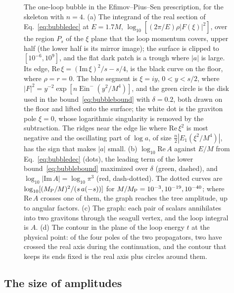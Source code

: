 \documentclass[aps,prd,10pt,twocolumn,superscriptaddress,nofootinbib,floatfix,longbibliography]{revtex4-2}
\newcommand{\Ein}{\operatorname{Ein}}
\begin{document}
\begin{figure}[t]
\caption{The one-loop bubble in the Efimov--Pius--Sen prescription, for the skeleton with $n=4$. (a) The integrand of the real section of Eq.~\eqref{eq:bubbledec} at $E=1.7M$, $\log_{10}[(2\pi/E)\rho|F(\xi)|^2]$, over the region $P_s$ of the $\xi$ plane that the loop momentum covers, upper half (the lower half is its mirror image); the surface is clipped to $[10^{-6},10^{9}]$, and the flat dark patch is a trough where $|a|$ is large. Its edge, $\mathrm{Re}\,\xi=(\mathrm{Im}\,\xi)^2/s-s/4$, is the black curve on the floor, where $\rho=r=0$. The blue segment is $\xi=iy$, $0<y<s/2$, where $|F|^2=y^{-2}\exp[n\Ein^-(y^2/M^4)]$, and the green circle is the disk used in the bound~\eqref{eq:bubblebound} with $\delta=0.2$, both drawn on the floor and lifted onto the surface; the white dot is the graviton pole $\xi=0$, whose logarithmic singularity is removed by the subtraction. The ridges near the edge lie where $\mathrm{Re}\,\xi^2$ is most negative and the oscillating part of $\log a$, of size $\frac n2|E_1(\xi^2/M^4)|$, has the sign that makes $|a|$ small. (b) $\log_{10}\mathrm{Re}\,A$ against $E/M$ from Eq.~\eqref{eq:bubbledec} (dots), the leading term of the lower bound~\eqref{eq:bubblebound} maximized over $\delta$ (green, dashed), and $\log_{10}|\mathrm{Im}\,A|=\log_{10}\pi^3$ (red, dash-dotted). The dotted curves are $\log_{10}[(M_{\rm P}/M)^2/(s\,a(-s))]$ for $M/M_{\rm P}=10^{-3},10^{-19},10^{-40}$; where $\mathrm{Re}\,A$ crosses one of them, the graph reaches the tree amplitude, up to angular factors. (c) The graph: each pair of scalars annihilates into two gravitons through the seagull vertex, and the loop integral is $A$. (d) The contour in the plane of the loop energy $t$ at the physical point: of the four poles of the two propagators, two have crossed the real axis during the continuation, and the contour that keeps its ends fixed is the real axis plus circles around them.}
\label{fig:bubble}
\end{figure}

\subsection{The size of amplitudes}
\label{sec:size}
\end{document}
